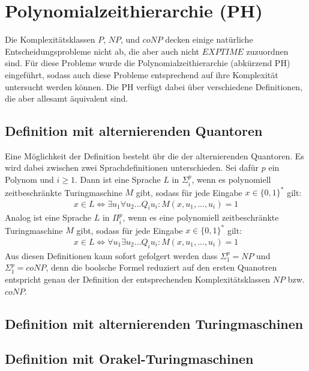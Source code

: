 \chapter{Polynomialzeithierarchie (PH)} \label{chapter: Polynomialzeithierarchie (PH)}
Die Komplexitätsklassen $P$, $NP$, und $coNP$ decken einige natürliche Entscheidungsprobleme nicht ab, die aber auch 
nicht $EXPTIME$ zuzuordnen sind. Für diese Probleme wurde die Polynomialzeithierarchie (abkürzend PH) eingeführt, sodass 
auch diese Probleme entsprechend auf ihre Komplexität untersucht werden können.
Die PH verfügt dabei über verschiedene Definitionen, die aber allesamt äquivalent sind.


\section{Definition mit alternierenden Quantoren} \label{section: Definition PH mit alternierenden Quantoren}
Eine Möglichkeit der Definition besteht übr die der alternierenden Quantoren. Es wird dabei zwischen zwei Sprachdefinitionen unterschieden.
Sei dafür $p$ ein Polynom und $i \geq 1$. Dann ist eine Sprache $L$ in $\Sigma^p_i$, wenn es polynomiell zeitbeschränkte Turingmaschine $M$ gibt, 
sodass für jede Eingabe $x \in \{0,1\}^*$ gilt:
\begin{align*}
    x \in L \Leftrightarrow \exists u_1 \forall u_2 ... Q_i u_i : M(x, u_1, ..., u_i) = 1
\end{align*}
Analog ist eine Sprache $L$ in $\Pi^p_i$, wenn es eine polynomiell zeitbeschränkte Turingmaschine $M$ gibt, sodass für jede Eingabe $x \in \{0,1\}^*$ gilt:
\begin{align*}
    x \in L \Leftrightarrow \forall u_1 \exists u_2 ... Q_i u_i : M(x, u_1, ..., u_i) = 1
\end{align*}
Aus diesen Definitionen kann sofort gefolgert werden dass $\Sigma^p_1 = NP$ und $\Sigma^p_1 = coNP$, denn die boolsche Formel reduziert auf 
den ersten Quanotren entspricht genau der Definition der entsprechenden Komplexitätsklassen $NP$ bzw. $coNP$.
\section{Definition mit alternierenden Turingmaschinen} \label{section: Definition PH mit ATM}


\section{Definition mit Orakel-Turingmaschinen} \label{section: Definition PH mit Orakel-Turingmaschinen}